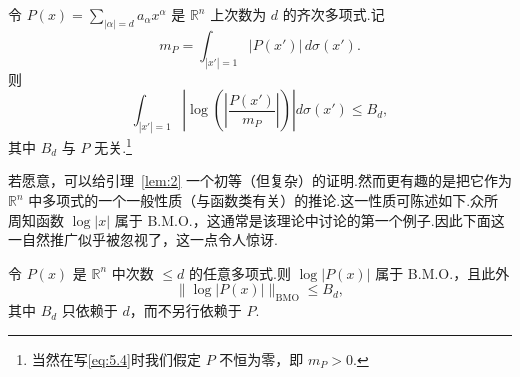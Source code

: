 \documentclass[
  BookTitleCN={傅里叶分析中的振动积分},
  BookTitleEN={Oscillatory Integrals in Fourier Analysis},
  OriginalAuthor={E.~M. Stein},
  OriginalEdition={Proc. Sympos. Pure Math. 35, Part~1},
  OriginalPublisher={American Mathematical Society},
  OriginalYear={1979},
  Translator={翻译及重排},
  ModelUsed={Codex CLI},
  Biblatex=false,
  TranslationDate={2026年8月27日}
]{mathtranslation}
\numberwithin{equation}{chapter}   %
\newcommand{\R}{\mathbb{R}}
\begin{document}
\begin{lemma}\label{lem:2}
  令 $P(x)=\sum_{|\alpha|=d}a_{\alpha}x^{\alpha}$ 是 $\R^{n}$ 上次数为 $d$ 的齐次多项式.记
  \[
    m_{P}=\int_{|x'|=1}|P(x')|\,d\sigma(x') .
  \]
  则
  \begin{equation}
    \int_{|x'|=1}\left|\log\left(\left|\frac{P(x')}{m_{P}}\right|\right)\right|d\sigma(x')\leq B_{d}, \label{eq:5.4}
  \end{equation}
  其中 $B_{d}$ 与 $P$ 无关.\footnote{当然在写\eqref{eq:5.4}时我们假定 $P$ 不恒为零，即 $m_{P}>0$.}
\end{lemma}

\noindent 若愿意，可以给引理~\ref{lem:2} 一个初等（但复杂）的证明.然而更有趣的是把它作为 $\R^{n}$ 中多项式的一个一般性质（与函数类有关）的推论.这一性质可陈述如下.众所周知函数 $\log|x|$ 属于 B.M.O.，这通常是该理论中讨论的第一个例子.因此下面这一自然推广似乎被忽视了，这一点令人惊讶.

\begin{theorem}\label{thm:6}
  令 $P(x)$ 是 $\R^{n}$ 中次数 $\leq d$ 的任意多项式.则 $\log|P(x)|$ 属于 B.M.O.，且此外
  \[
    \|\log|P(x)|\|_{\mathrm{BMO}}\leq B_{d},
  \]
  其中 $B_{d}$ 只依赖于 $d$，而不另行依赖于 $P$.
\end{theorem}
\end{document}
